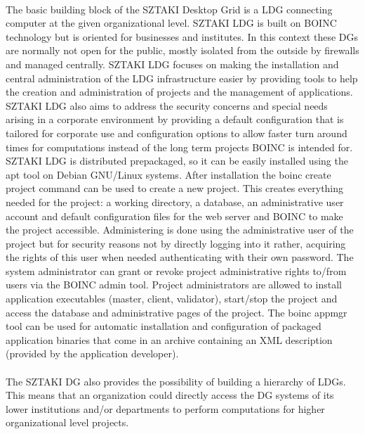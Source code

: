 \documentclass[10pt, twocolumn, letterpaper]{article}
\begin{document}
\paragraph{}
The basic building block of the SZTAKI Desktop Grid is a LDG connecting computer at the given organizational level. SZTAKI LDG is built on BOINC technology but is oriented for businesses and institutes. In this context these DGs are normally not open for the public, mostly isolated from the outside by firewalls and managed centrally. SZTAKI LDG focuses on making the installation and central administration of the LDG infrastructure easier by providing tools to help the creation and administration of projects and the management of applications. SZTAKI LDG also aims to address the security concerns and special needs arising in a corporate environment by providing a default configuration that is tailored for corporate use and configuration options to allow faster turn around times for computations instead of the long term projects BOINC is intended for. SZTAKI LDG is distributed prepackaged, so it can be easily installed using the apt tool on Debian GNU/Linux systems. After installation the \textsf{boinc create project} command can be used to create a new project. This creates everything needed for the project: a working directory, a database, an administrative user account and default configuration files for the web server and BOINC to make the project accessible. Administering is done using the administrative user of the project but for security reasons not by directly logging into it rather, acquiring the rights of this user when needed authenticating with their own password. The system administrator can grant or revoke project administrative rights to/from users via the BOINC admin tool. Project administrators are allowed to install application executables (master, client, validator), start/stop the project and access the database and administrative pages of the project. The \textsf{boinc appmgr} tool can be used for automatic installation and configuration of packaged application binaries that come in an archive containing an XML description (provided by the application developer).

\paragraph{}
The SZTAKI DG also provides the possibility of building a hierarchy of LDGs. This means that an organization could directly access the DG systems of its lower institutions and/or departments to perform computations for higher organizational level projects.
\end{document}
